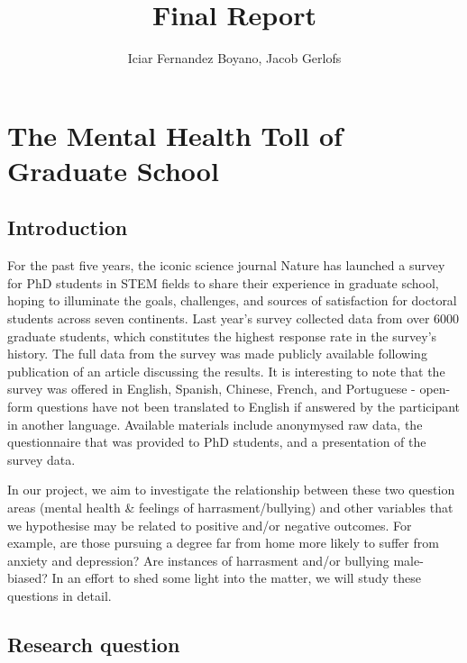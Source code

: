 \documentclass[
]{article}
\title{Final Report}
\author{Iciar Fernandez Boyano, Jacob Gerlofs}
\date{}
\begin{document}
\maketitle

\hypertarget{the-mental-health-toll-of-graduate-school}{%
\section{The Mental Health Toll of Graduate
School}\label{the-mental-health-toll-of-graduate-school}}

\hypertarget{introduction}{%
\subsection{Introduction}\label{introduction}}

For the past five years, the iconic science journal Nature has launched
a survey for PhD students in STEM fields to share their experience in
graduate school, hoping to illuminate the goals, challenges, and sources
of satisfaction for doctoral students across seven continents. Last
year's survey collected data from over 6000 graduate students, which
constitutes the highest response rate in the survey's history. The full
data from the survey was made publicly available following publication
of an article discussing the results. It is interesting to note that the
survey was offered in English, Spanish, Chinese, French, and Portuguese
- open-form questions have not been translated to English if answered by
the participant in another language. Available materials include
anonymysed raw data, the questionnaire that was provided to PhD
students, and a presentation of the survey data.

In our project, we aim to investigate the relationship between these two
question areas (mental health \& feelings of harrasment/bullying) and
other variables that we hypothesise may be related to positive and/or
negative outcomes. For example, are those pursuing a degree far from
home more likely to suffer from anxiety and depression? Are instances of
harrasment and/or bullying male-biased? In an effort to shed some light
into the matter, we will study these questions in detail.

\hypertarget{research-question}{%
\subsection{Research question}\label{research-question}}
\end{document}
